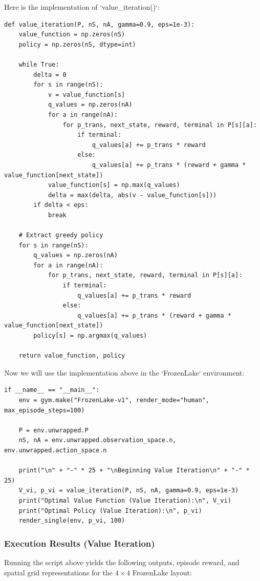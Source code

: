 \documentclass{article}
\begin{document}
\begin{enumerate}
    Here is the implementation of `value\_iteration()`:

    \begin{lstlisting}[caption={implementation of `value\_iteration()`},label={lst:beat}]
def value_iteration(P, nS, nA, gamma=0.9, eps=1e-3):
    value_function = np.zeros(nS)
    policy = np.zeros(nS, dtype=int)

    while True:
        delta = 0
        for s in range(nS):
            v = value_function[s]
            q_values = np.zeros(nA)
            for a in range(nA):
                for p_trans, next_state, reward, terminal in P[s][a]:
                    if terminal:
                        q_values[a] += p_trans * reward
                    else:
                        q_values[a] += p_trans * (reward + gamma * value_function[next_state])
            value_function[s] = np.max(q_values)
            delta = max(delta, abs(v - value_function[s]))
        if delta < eps:
            break

    # Extract greedy policy
    for s in range(nS):
        q_values = np.zeros(nA)
        for a in range(nA):
            for p_trans, next_state, reward, terminal in P[s][a]:
                if terminal:
                    q_values[a] += p_trans * reward
                else:
                    q_values[a] += p_trans * (reward + gamma * value_function[next_state])
        policy[s] = np.argmax(q_values)

    return value_function, policy
    \end{lstlisting}


    Now we will use the implementation above in the `FrozenLake` environment:

\begin{lstlisting}[caption={Execution script for FrozenLake using Value Iteration},label={lst:main_exec_vi}]
if __name__ == "__main__":
    env = gym.make("FrozenLake-v1", render_mode="human", max_episode_steps=100) 
    
    P = env.unwrapped.P
    nS, nA = env.unwrapped.observation_space.n, env.unwrapped.action_space.n

    print("\n" + "-" * 25 + "\nBeginning Value Iteration\n" + "-" * 25)
    V_vi, p_vi = value_iteration(P, nS, nA, gamma=0.9, eps=1e-3)
    print("Optimal Value Function (Value Iteration):\n", V_vi)
    print("Optimal Policy (Value Iteration):\n", p_vi)
    render_single(env, p_vi, 100)
\end{lstlisting}

\subsubsection*{Execution Results (Value Iteration)}
Running the script above yields the following outputs, episode reward, and spatial grid representations for the $4 \times 4$ FrozenLake layout:


\end{enumerate}
\end{document}

